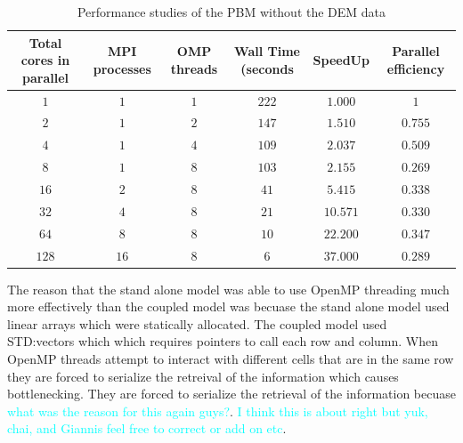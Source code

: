 \documentclass[preprint,11pt,authoryear]{elsarticle}
\begin{document}
\begin{table}[H]
\caption{Performance studies of the PBM without the DEM data}
\label{table:rslts_performance_DEM_without_DEM}
\begin{center}
\begin{tabulary}{\linewidth}{C|C|C|C|C|C}
\hline
\bf{Total cores in parallel}&\bf{MPI processes}&\bf{OMP threads}& \bf{Wall Time (seconds}&
\bf{SpeedUp}& \bf{Parallel efficiency}\\
\hline
$1$ & $1$ & $1$ & $222$ & $1.000$ & $1$\\
$2$ & $1$ & $2$ & $147$ & $1.510$ & $0.755$\\
$4$ & $1$ & $4$ & $109$ & $2.037$ & $0.509$\\
$8$ & $1$ & $8$ & $103$ & $2.155$ & $0.269$\\
$16$ & $2$ & $8$ & $41$ & $5.415$ & $0.338$\\
$32$ & $4$ & $8$ & $21$ & $10.571$ & $0.330$\\
$64$ & $8$ & $8$ & $10$ & $22.200$ & $0.347$\\
$128$ & $16$ & $8$ & $6$ & $37.000$ & $0.289$\\
\hline
\end{tabulary}
\end{center}
\label{table:rslts_sa_pbm_perf}
\end{table}



The reason that the stand alone model was able to use OpenMP threading much more effectively than the coupled model was becuase the stand alone model used linear arrays which were statically allocated. The coupled model used STD:vectors which which requires pointers to call each row and column. When OpenMP threads attempt to interact with different cells that are in the same row they are forced to serialize the retreival of the information which causes bottlenecking. They are forced to serialize the retrieval of the information becuase \textcolor{cyan}{ what was the reason for this again guys?}.
\textcolor{cyan}{I think this is about right but yuk, chai, and Giannis feel free to correct or add on etc}.



 
\end{document}
